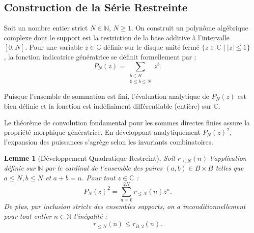 \documentclass[12pt,a4paper]{article}
\newtheorem{lemma}[theorem]{Lemme}
\begin{document}
\subsection{Construction de la S\'erie Restreinte}

Soit un nombre entier strict $N \in \mathbb{N}$, $N \ge 1$. On construit un polyn\^ome alg\'ebrique complexe dont le support est la restriction de la base additive \`a l'intervalle $[0, N]$. Pour une variable $z \in \mathbb{C}$ d\'efinie sur le disque unit\'e ferm\'e $\{ z \in \mathbb{C} \mid |z| \le 1 \}$, la fonction indicatrice g\'en\'eratrice se d\'efinit formellement par :
\begin{equation}
P_N(z) = \sum_{\substack{b \in B \\ 0 \le b \le N}} z^b.
\end{equation}

Puisque l'ensemble de sommation est fini, l'\'evaluation analytique de $P_N(z)$ est bien d\'efinie et la fonction est ind\'efiniment diff\'erentiable (enti\`ere) sur $\mathbb{C}$.

Le th\'eor\`eme de convolution fondamental pour les sommes directes finies assure la propri\'et\'e morphique g\'en\'eratrice. En d\'eveloppant analytiquement $P_N(z)^2$, l'expansion des puissances s'agr\`ege selon les invariants combinatoires.

\begin{lemma}[D\'eveloppement Quadratique Restreint]
Soit $r_{\le N}(n)$ l'application d\'efinie sur $\mathbb{N}$ par le cardinal de l'ensemble des paires $(a,b) \in B \times B$ telles que $a \le N, b \le N$ et $a+b = n$.
Pour tout $z \in \mathbb{C}$ :
\begin{equation}
P_N(z)^2 = \sum_{n=0}^{2N} r_{\le N}(n) z^n.
\end{equation}
De plus, par inclusion stricte des ensembles supports, on a inconditionnellement pour tout entier $n \in \mathbb{N}$ l'in\'egalit\'e :
\begin{equation}
r_{\le N}(n) \le r_{B,2}(n).
\end{equation}
\end{lemma}
\end{document}
